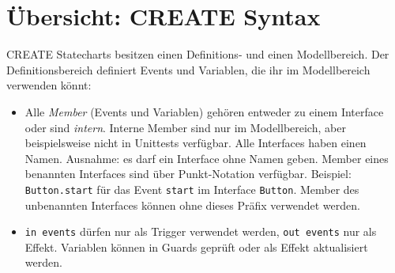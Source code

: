 \newcommand{\printpraesenzlsg}{false}
\newcommand{\printloesungen}{false}
\newcommand{\printbewertungen}{false}
\newcommand{\blattnummer}{4}

\usepackage[utf8]{inputenc}
\usepackage{array}


\iforiginal{}


	
\section*{Übersicht: CREATE Syntax}

CREATE Statecharts besitzen einen Definitions- und einen Modellbereich. Der Definitionsbereich definiert Events und
Variablen, die ihr im Modellbereich verwenden könnt:

\begin{itemize}[leftmargin=*, itemsep=0.4em]
  \item Alle \emph{Member} (Events und Variablen) gehören entweder zu einem Interface oder sind \emph{intern}.
  Interne Member sind nur im Modellbereich, aber beispielsweise nicht in Unittests verfügbar.
  Alle Interfaces haben einen Namen. Ausnahme: es darf ein Interface ohne Namen geben.
  Member eines benannten Interfaces sind über Punkt-Notation verfügbar.
  Beispiel: \texttt{Button.start} für das Event \texttt{start} im Interface \texttt{Button}.
  Member des unbenannten Interfaces können ohne dieses Präfix verwendet werden.

  \item \texttt{in events} dürfen nur als Trigger verwendet werden, \texttt{out events} nur als Effekt.
  Variablen können in Guards geprüft oder als Effekt aktualisiert werden.
\end{itemize}

